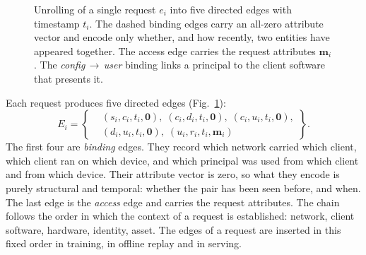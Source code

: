 \begin{figure}[t]
\centering
{}
\caption{Unrolling of a single request $e_i$ into five directed edges with timestamp
$t_i$. The dashed binding edges carry an all-zero attribute vector and encode only
whether, and how recently, two entities have appeared together. The access edge carries
the request attributes $\mathbf{m}_i$. The \textit{config}\,$\rightarrow$\,\textit{user}
binding links a principal to the client software that presents it.}
\label{fig:tgr-chain}
\end{figure}

Each request produces five directed edges (Fig.~\ref{fig:tgr-chain}):
\begin{equation}
  E_i = \left\{
  \begin{aligned}
    &(s_i, c_i, t_i, \mathbf{0}),\; (c_i, d_i, t_i, \mathbf{0}),\; (c_i, u_i, t_i, \mathbf{0}),\\
    &(d_i, u_i, t_i, \mathbf{0}),\; (u_i, r_i, t_i, \mathbf{m}_i)
  \end{aligned}
  \right\}.
  \label{eq:tgr-unroll}
\end{equation}
The first four are \emph{binding} edges. They record which network carried which
client, which client ran on which device, and which principal was used from which
client and from which device. Their attribute vector is zero, so what they encode is
purely structural and temporal: whether the pair has been seen before, and when. The
last edge is the \emph{access} edge and carries the request attributes. The chain follows
the order in which the context of a request is established: network, client software,
hardware, identity, asset. The edges of a request are inserted in this fixed order in
training, in offline replay and in serving.

